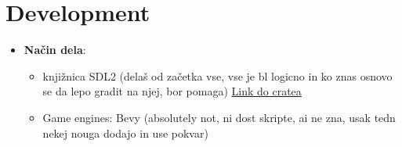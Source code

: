 \documentclass[a4paper]{article}
\begin{document}
\section{Development}
\begin{itemize}
    \item \textbf{Način dela}: \begin{itemize}
        \item knjižnica SDL2 (delaš od začetka vse, vse je bl logicno in ko znas osnovo se da lepo gradit na njej, bor pomaga) \href{https://crates.io/crates/sdl1_2-rs}{Link do cratea}
        \item Game engines: Bevy (absolutely not, ni dost skripte, ai ne zna, usak tedn nekej nouga dodajo in use pokvar)
    \end{itemize}
\end{itemize}
\end{document}
